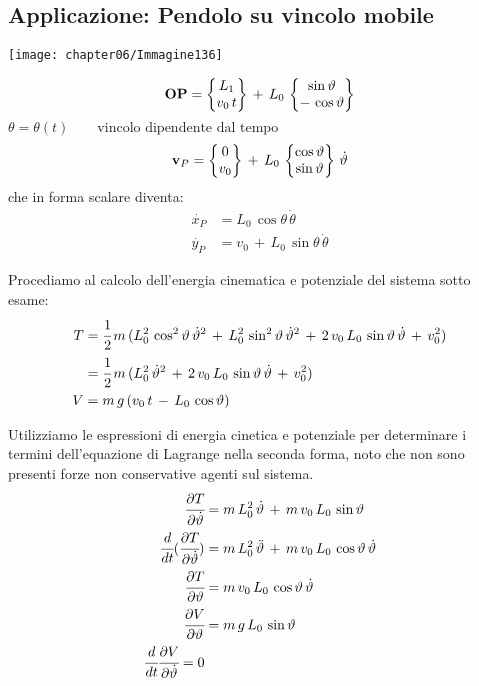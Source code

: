 \subsection{Applicazione: Pendolo su vincolo mobile}

\begin{minipage}{.45\textwidth}
\centering
\texttt{[image: chapter06/Immagine136]}
\end{minipage}
\hfill
\begin{minipage}{.5\textwidth}
\[\mathbf{OP} = \B{L_1\\v_0\,t}\,+\,L_0\,\B{\sin{\theta}\\-\,\cos{\theta}}\]
$\theta = \theta (t)\qquad\text{vincolo dipendente dal tempo}$
\[\mathbf{v}_P = \B{0\\v_0}\,+\,L_0\,\B{\cos{\theta}\\\sin{\theta}}\,\dot{\theta}\]
che in forma scalare diventa:
\begin{align*}
\dot{x_P} &= L_0\,\cos{\theta}\,\dot{\theta}\\
\dot{y_P} &= v_0\,+\,L_0\,\sin{\theta}\,\dot{\theta}
\end{align*}
\end{minipage}

Procediamo al calcolo dell'energia cinematica e potenziale del sistema sotto esame:
\begin{align*}
T &= \cfrac{1}{2}\,m\,(L_0^2\,\cos^2{\theta}\,\dot{\theta}^2\,+\,L_0^2\,\sin^2{\theta}\,\dot{\theta}^2\,+\,2\,v_0\,L_0\,\sin{\theta}\,\dot{\theta}\,+\,v_0^2)\\
&= \cfrac{1}{2}\,m\,(L_0^2\,\dot{\theta}^2\,+\,2\,v_0\,L_0\,\sin{\theta}\,\dot{\theta}\,+\,v_0^2)\\
V &= m\,g\,(v_0\,t\,-\,L_0\,\cos{\theta})
\end{align*}

Utilizziamo le espressioni di energia cinetica e potenziale per determinare i termini dell'equazione di Lagrange nella seconda forma, noto che non sono presenti forze non conservative agenti sul sistema.
\begin{align*}
	\pd{T}{\dot{\theta}} &= m\,L_0^2\,\dot{\theta}\,+\,m\,v_0\,L_0\,\sin{\theta}\\
	\td{}{t}(\pd{T}{\dot{\theta}}) &= m\,L_0^2\,\ddot{\theta}\,+\,m\,v_0\,L_0\,\cos{\theta}\,\dot{\theta}\\
	\pd{T}{\theta} &= m\,v_0\,L_0\,\cos{\theta}\,\dot{\theta}\\
	\pd{V}{\theta} &= m\,g\,L_0\,\sin{\theta}\\
	\td{}{t}\pd{V}{\dot{\theta}} = 0
\end{align*}



